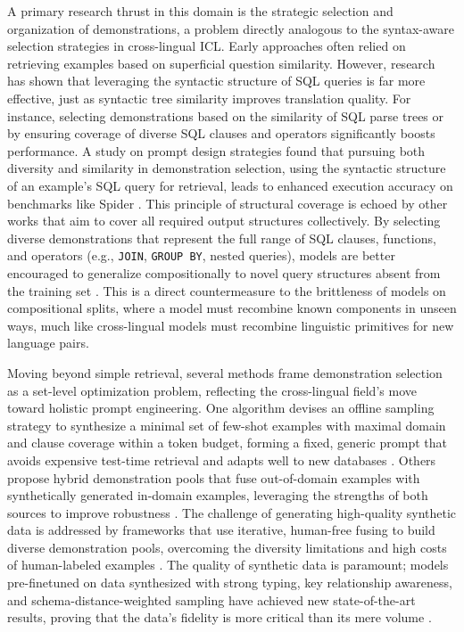\documentclass[11pt]{article}
\begin{document}
A primary research thrust in this domain is the strategic selection and organization of demonstrations, a problem directly analogous to the syntax-aware selection strategies in cross-lingual ICL. Early approaches often relied on retrieving examples based on superficial question similarity. However, research has shown that leveraging the syntactic structure of SQL queries is far more effective, just as syntactic tree similarity improves translation quality. For instance, selecting demonstrations based on the similarity of SQL parse trees or by ensuring coverage of diverse SQL clauses and operators significantly boosts performance. A study on prompt design strategies found that pursuing both diversity and similarity in demonstration selection, using the syntactic structure of an example's SQL query for retrieval, leads to enhanced execution accuracy on benchmarks like Spider \cite{ref507}. This principle of structural coverage is echoed by other works that aim to cover all required output structures collectively. By selecting diverse demonstrations that represent the full range of SQL clauses, functions, and operators (e.g., \texttt{JOIN}, \texttt{GROUP\ BY}, nested queries), models are better encouraged to generalize compositionally to novel query structures absent from the training set \cite{ref523}. This is a direct countermeasure to the brittleness of models on compositional splits, where a model must recombine known components in unseen ways, much like cross-lingual models must recombine linguistic primitives for new language pairs.

Moving beyond simple retrieval, several methods frame demonstration selection as a set-level optimization problem, reflecting the cross-lingual field's move toward holistic prompt engineering. One algorithm devises an offline sampling strategy to synthesize a minimal set of few-shot examples with maximal domain and clause coverage within a token budget, forming a fixed, generic prompt that avoids expensive test-time retrieval and adapts well to new databases \cite{ref524}. Others propose hybrid demonstration pools that fuse out-of-domain examples with synthetically generated in-domain examples, leveraging the strengths of both sources to improve robustness \cite{ref525}. The challenge of generating high-quality synthetic data is addressed by frameworks that use iterative, human-free fusing to build diverse demonstration pools, overcoming the diversity limitations and high costs of human-labeled examples \cite{ref526}. The quality of synthetic data is paramount; models pre-finetuned on data synthesized with strong typing, key relationship awareness, and schema-distance-weighted sampling have achieved new state-of-the-art results, proving that the data's fidelity is more critical than its mere volume \cite{ref527}.
\end{document}
